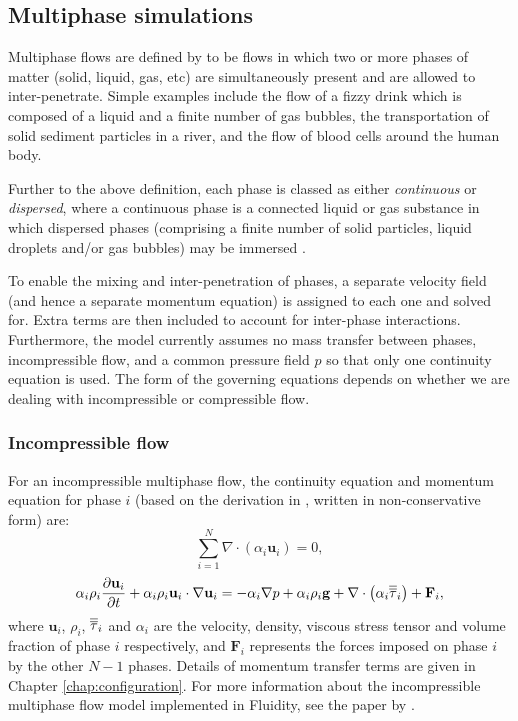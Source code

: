 \subsection{Multiphase simulations}
\label{sec:multiphase_equations}
Multiphase flows are defined by \cite{prosperettiEtAl2007} to be flows in which two or more phases of matter (solid, liquid, gas, etc) are simultaneously present and are allowed to inter-penetrate. Simple examples include the flow of a fizzy drink which is composed of a liquid and a finite number of gas bubbles, the transportation of solid sediment particles in a river, and the flow of blood cells around the human body.

Further to the above definition, each phase is classed as either \textit{continuous} or \textit{dispersed}, where a continuous phase is a connected liquid or gas substance in which dispersed phases (comprising a finite number of solid particles, liquid droplets and/or gas bubbles) may be immersed \citep{croweEtAl1998}.

To enable the mixing and inter-penetration of phases, a separate velocity field (and hence a separate momentum equation) is assigned to each one and solved for. Extra terms are then included to account for inter-phase interactions. Furthermore, the model currently assumes no mass transfer between phases, incompressible flow, and a common pressure field $p$ so that only one continuity equation is used. The form of the governing equations depends on whether we are dealing with incompressible or compressible flow.

\subsubsection{Incompressible flow}
For an incompressible multiphase flow, the continuity equation and momentum equation for phase $i$ (based on the derivation in \cite{ishii1975}, written in non-conservative form) are:
\begin{equation}
\sum_{i=1}^N\nabla\cdot\left(\alpha_i\mathbf{u}_i\right) = 0,
\end{equation}
\begin{equation}
\alpha_i\rho_i\frac{\partial \mathbf{u}_i}{\partial t} +
\alpha_i\rho_i\mathbf{u}_i\cdot\nabla\mathbf{u}_i =
-\alpha_i\nabla p + \alpha_i\rho_i\mathbf{g} +
\nabla\cdot\left(\alpha_i\overline{\overline{\tau}}_i\right) +
\mathbf{F}_i,
\end{equation}
where $\mathbf{u}_i$, $\rho_i$, $\overline{\overline{\tau}}_i$ and $\alpha_i$ are the velocity, density, viscous stress tensor and volume fraction of phase $i$ respectively, and $\mathbf{F}_i$ represents the forces imposed on phase $i$ by the other $N-1$ phases. Details of momentum transfer terms are given in Chapter \ref{chap:configuration}. For more information about the incompressible multiphase flow model implemented in Fluidity, see the paper by \cite{Jacobs_etal_2013}.

